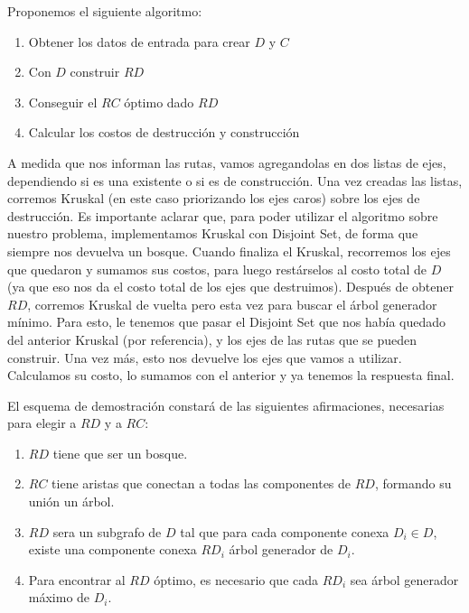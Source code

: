 Proponemos el siguiente algoritmo:

\begin{enumerate}
	\item Obtener los datos de entrada para crear $D$ y $C$

	\item Con $D$ construir $RD$

	\item Conseguir el $RC$ óptimo dado $RD$

	\item Calcular los costos de destrucción y construcción
\end{enumerate}

A medida que nos informan las rutas, vamos agregandolas en dos listas de ejes, dependiendo si es una existente o si es de construcción. Una vez creadas las listas, corremos Kruskal (en este caso priorizando los ejes caros)  sobre los ejes de destrucción. Es importante aclarar que, para poder utilizar el algoritmo sobre nuestro problema, implementamos Kruskal con Disjoint Set, de forma que siempre nos devuelva un bosque. Cuando finaliza el Kruskal, recorremos los ejes que quedaron y sumamos sus costos, para luego restárselos al costo total de $D$ (ya que eso nos da el costo total de los ejes que destruimos). Después de obtener $RD$, corremos Kruskal de vuelta pero esta vez para buscar el árbol generador mínimo. Para esto, le tenemos que pasar el Disjoint Set que nos había quedado del anterior Kruskal (por referencia), y los ejes de las rutas que se pueden construir. Una vez más, esto nos devuelve los ejes que vamos a utilizar. Calculamos su costo, lo sumamos con el anterior y ya tenemos la respuesta final.

El esquema de demostración constará de las siguientes afirmaciones, necesarias para elegir a $RD$ y a $RC$:

\begin{enumerate}
	\item $RD$ tiene que ser un bosque.

	\item $RC$ tiene aristas que conectan a todas las componentes de $RD$, formando su unión un árbol.

	\item $RD$ sera un subgrafo de $D$ tal que para cada componente conexa $D_i \in D$, existe una componente conexa $RD_i$ árbol generador de $D_i$.

	\item Para encontrar al $RD$ óptimo, es necesario que cada $RD_i$ sea árbol generador máximo de $D_i$.
\end{enumerate}

